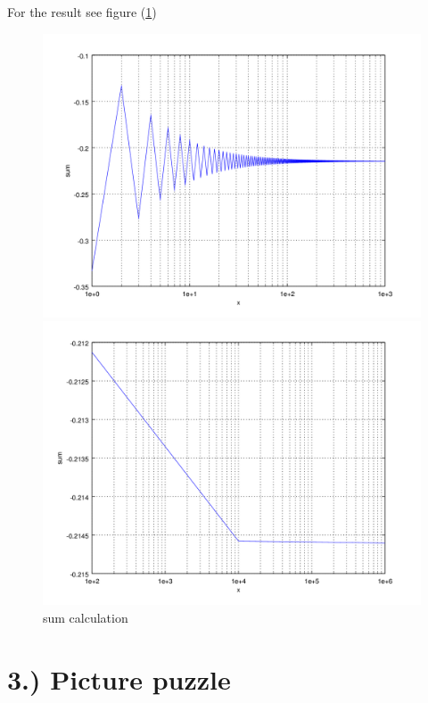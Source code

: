 \documentclass{scrartcl}
\begin{document}
For the result see figure (\ref{pic:sum})
\begin{figure}[htp!]
	\begin{minipage}[t]{0.5\textwidth}
		\includegraphics[width=\textwidth]{sum1.png}
	\end{minipage}
	\begin{minipage}[t]{0.5\textwidth}
		\includegraphics[width=\textwidth]{sum2.png}
	\end{minipage}
	\caption{sum calculation}
	\label{pic:sum}
\end{figure} 

\section*{3.) Picture puzzle}
\end{document}
